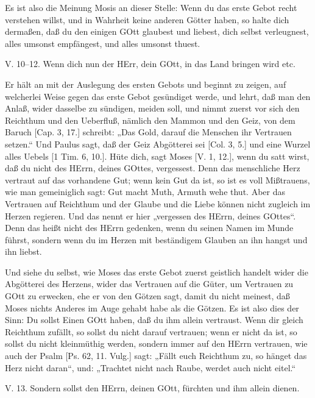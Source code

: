 Es ist also die Meinung Mosis an dieser Stelle: Wenn du das erste Gebot recht verstehen willst, und in Wahrheit keine anderen Götter haben, so halte dich dermaßen, daß du den einigen GOtt glaubest und liebest, dich selbst verleugnest, alles umsonst empfängest, und alles umsonst thuest.

\begin{schriftzitat}
V. 10–12. Wenn dich nun der HErr, dein GOtt, in das Land bringen wird etc.
\end{schriftzitat}

Er hält an mit der Auslegung des ersten Gebots und beginnt zu zeigen, auf welcherlei Weise gegen das erste Gebot gesündiget werde, und lehrt, daß man den Anlaß, wider dasselbe zu sündigen, meiden soll, und nimmt zuerst vor sich den Reichthum und den Ueberfluß, nämlich den Mammon und den Geiz, von dem Baruch [Cap. 3, 17.] schreibt: „Das Gold, darauf die Menschen ihr Vertrauen setzen.“ Und Paulus sagt, daß der Geiz Abgötterei sei [Col. 3, 5.] und eine Wurzel alles Uebels [1 Tim. 6, 10.]. Hüte dich, sagt Moses [V. 1, 12.], wenn du satt wirst, daß du nicht des HErrn, deines GOttes, vergessest. Denn das menschliche Herz vertraut auf das vorhandene Gut; wenn kein Gut da ist, so ist es voll Mißtrauens, wie man gemeiniglich sagt: Gut macht Muth, Armuth wehe thut. Aber das Vertrauen auf Reichthum und der Glaube und die Liebe können nicht zugleich im Herzen regieren. Und das nennt er hier „vergessen des HErrn, deines GOttes“. Denn das heißt nicht des HErrn gedenken, wenn du seinen Namen im Munde führst, sondern wenn du im Herzen mit beständigem Glauben an ihn hangst und ihn liebst.

Und siehe du selbst, wie Moses das erste Gebot zuerst geistlich handelt wider die Abgötterei des Herzens, wider das Vertrauen auf die Güter, um Vertrauen zu GOtt zu erwecken, ehe er von den Götzen sagt, damit du nicht meinest, daß Moses nichts Anderes im Auge gehabt habe als die Götzen. Es ist also dies der Sinn: Du sollst Einen GOtt haben, daß du ihm allein vertraust. Wenn dir gleich Reichthum zufällt, so sollst du nicht darauf vertrauen; wenn er nicht da ist, so sollst du nicht kleinmüthig werden, sondern immer auf den HErrn vertrauen, wie auch der Psalm [Ps. 62, 11. Vulg.] sagt: „Fällt euch Reichthum zu, so hänget das Herz nicht daran“, und: „Trachtet nicht nach Raube, werdet auch nicht eitel.“

\begin{schriftzitat}
V. 13. Sondern sollst den HErrn, deinen GOtt, fürchten und ihm allein dienen.
\end{schriftzitat}

